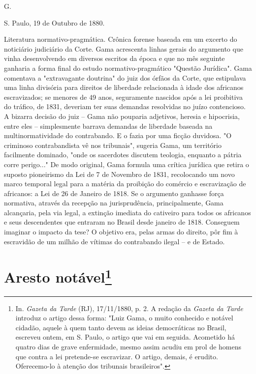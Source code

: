 G.

S. Paulo, 19 de Outubro de 1880.

\pagebreak
\mbox{}\vfill
\thispagestyle{empty}

{\small\noindent
Literatura normativo-pragmática. Crônica forense baseada em um
excerto do noticiário judiciário da Corte. Gama acrescenta linhas gerais
do argumento que vinha desenvolvendo em diversos escritos da época e que
no mês seguinte ganharia a forma final do estudo normativo-pragmático
"Questão Jurídica". Gama comentava a "extravagante doutrina" do juiz dos
órfãos da Corte, que estipulava uma linha divisória para direitos de
liberdade relacionada à idade dos africanos escravizados; se menores de
49 anos, seguramente nascidos após a lei proibitiva do tráfico, de 1831,
deveriam ter suas demandas resolvidas no juízo contencioso. A bizarra
decisão do juiz -- Gama não pouparia adjetivos, heresia e hipocrisia,
entre eles -- simplesmente barrava demandas de liberdade baseada na
multinormatividade do contrabando. E o fazia por uma ficção duvidosa. "O
criminoso contrabandista vê nos tribunais", sugeria Gama, um território
facilmente dominado, "onde os sacerdotes discutem teologia, enquanto a
pátria corre perigo..." De modo original, Gama formula uma crítica
jurídica que retira o suposto pioneirismo da Lei de 7 de Novembro de
1831, recolocando um novo marco temporal legal para a matéria da
proibição do comércio e escravização de africanos: a Lei de 26 de
Janeiro de 1818. Se o argumento ganhasse força normativa, através da
recepção na jurisprudência, principalmente, Gama alcançaria, pela via
legal, a extinção imediata do cativeiro para todos os africanos e seus
descendentes que entraram no Brasil desde janeiro de 1818. Conseguem
imaginar o impacto da tese? O objetivo era, pelas armas do direito, pôr
fim à escravidão de um milhão de vítimas do contrabando ilegal -- e de
Estado. }

\chapter{Aresto notável\footnote[*]{In. \emph{Gazeta da Tarde} (RJ),
  17/11/1880, p. 2. A redação da \emph{Gazeta da Tarde} introduz o
  artigo dessa forma: "Luiz Gama, o muito conhecido e notável cidadão,
  aquele à quem tanto devem as ideias democráticas no Brasil, escreveu
  ontem, em S. Paulo, o artigo que vai em seguida. Acometido há quatro
  dias de grave enfermidade, mesmo assim acudiu em prol de homens que
  contra a lei pretende-se escravizar. O artigo, demais, é erudito.
  Oferecemo-lo à atenção dos tribunais brasileiros".}}


